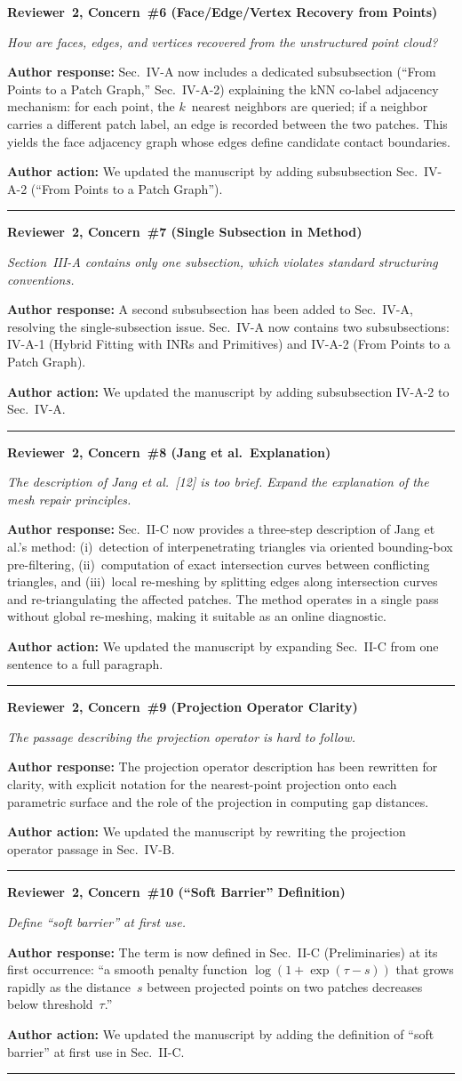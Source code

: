 \documentclass[11pt]{article}
\newcommand{\concern}[2]{\noindent\textbf{Reviewer~#1, Concern~\##2}\par}
\newcommand{\concerntext}[1]{\noindent\textit{#1}\par\medskip}
\newcommand{\authorresponse}[1]{\noindent\textbf{Author response:} #1\par\medskip}
\newcommand{\authoraction}[1]{\noindent\textbf{Author action:} We updated the manuscript by #1\par\bigskip\noindent\rule{\linewidth}{0.4pt}\par\medskip}
\begin{document}
\concern{2}{6 (Face/Edge/Vertex Recovery from Points)}
\concerntext{How are faces, edges, and vertices recovered from the
unstructured point cloud?}
\authorresponse{Sec.~IV-A now includes a dedicated subsubsection
(``From Points to a Patch Graph,'' Sec.~IV-A-2) explaining the kNN
co-label adjacency mechanism: for each point, the $k$~nearest
neighbors are queried; if a neighbor carries a different patch label,
an edge is recorded between the two patches. This yields the face
adjacency graph whose edges define candidate contact boundaries.}
\authoraction{adding subsubsection Sec.~IV-A-2 (``From Points to a Patch Graph'').}

\concern{2}{7 (Single Subsection in Method)}
\concerntext{Section~III-A contains only one subsection, which violates
standard structuring conventions.}
\authorresponse{A second subsubsection has been added to Sec.~IV-A,
resolving the single-subsection issue.
Sec.~IV-A now contains two subsubsections:
IV-A-1 (Hybrid Fitting with INRs and Primitives) and
IV-A-2 (From Points to a Patch Graph).}
\authoraction{adding subsubsection IV-A-2 to Sec.~IV-A.}

\concern{2}{8 (Jang et al.\ Explanation)}
\concerntext{The description of Jang et al.\ [12] is too brief.
Expand the explanation of the mesh repair principles.}
\authorresponse{Sec.~II-C now provides a three-step description of Jang et
al.'s method: (i)~detection of interpenetrating triangles via
oriented bounding-box pre-filtering, (ii)~computation of exact
intersection curves between conflicting triangles, and
(iii)~local re-meshing by splitting edges along intersection
curves and re-triangulating the affected patches. The method
operates in a single pass without global re-meshing, making it
suitable as an online diagnostic.}
\authoraction{expanding Sec.~II-C from one sentence to a full paragraph.}

\concern{2}{9 (Projection Operator Clarity)}
\concerntext{The passage describing the projection operator is hard to follow.}
\authorresponse{The projection operator description has been rewritten for
clarity, with explicit notation for the nearest-point projection
onto each parametric surface and the role of the projection in
computing gap distances.}
\authoraction{rewriting the projection operator passage in Sec.~IV-B.}

\concern{2}{10 (``Soft Barrier'' Definition)}
\concerntext{Define ``soft barrier'' at first use.}
\authorresponse{The term is now defined in Sec.~II-C (Preliminaries) at its
first occurrence: ``a smooth penalty function
$\log(1+\exp(\tau-s))$ that grows rapidly as the distance~$s$
between projected points on two patches decreases below
threshold~$\tau$.''}
\authoraction{adding the definition of ``soft barrier'' at first use in Sec.~II-C.}
\end{document}
